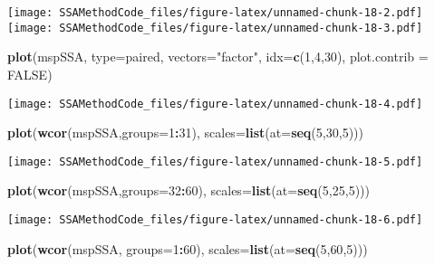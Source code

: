 \documentclass[
]{article}
\newenvironment{Shaded}{\begin{snugshade}}{\end{snugshade}}
\newcommand{\AttributeTok}[1]{\textcolor[rgb]{0.13,0.29,0.53}{#1}}
\newcommand{\ConstantTok}[1]{\textcolor[rgb]{0.56,0.35,0.01}{#1}}
\newcommand{\DecValTok}[1]{\textcolor[rgb]{0.00,0.00,0.81}{#1}}
\newcommand{\FunctionTok}[1]{\textcolor[rgb]{0.13,0.29,0.53}{\textbf{#1}}}
\newcommand{\NormalTok}[1]{#1}
\newcommand{\SpecialCharTok}[1]{\textcolor[rgb]{0.81,0.36,0.00}{\textbf{#1}}}
\newcommand{\StringTok}[1]{\textcolor[rgb]{0.31,0.60,0.02}{#1}}
\begin{document}
\texttt{[image: SSAMethodCode\_files/figure-latex/unnamed-chunk-18-2.pdf]}
\texttt{[image: SSAMethodCode\_files/figure-latex/unnamed-chunk-18-3.pdf]}

\begin{Shaded}
\begin{Highlighting}[]
\FunctionTok{plot}\NormalTok{(mspSSA, }\AttributeTok{type=}\StringTok{\textquotesingle{}paired\textquotesingle{}}\NormalTok{, }\AttributeTok{vectors=}\StringTok{"factor"}\NormalTok{, }\AttributeTok{idx=}\FunctionTok{c}\NormalTok{(}\DecValTok{1}\NormalTok{,}\DecValTok{4}\NormalTok{,}\DecValTok{30}\NormalTok{), }\AttributeTok{plot.contrib =} \ConstantTok{FALSE}\NormalTok{)}
\end{Highlighting}
\end{Shaded}

\texttt{[image: SSAMethodCode\_files/figure-latex/unnamed-chunk-18-4.pdf]}

\begin{Shaded}
\begin{Highlighting}[]
\FunctionTok{plot}\NormalTok{(}\FunctionTok{wcor}\NormalTok{(mspSSA,}\AttributeTok{groups=}\DecValTok{1}\SpecialCharTok{:}\DecValTok{31}\NormalTok{), }\AttributeTok{scales=}\FunctionTok{list}\NormalTok{(}\AttributeTok{at=}\FunctionTok{seq}\NormalTok{(}\DecValTok{5}\NormalTok{,}\DecValTok{30}\NormalTok{,}\DecValTok{5}\NormalTok{)))}
\end{Highlighting}
\end{Shaded}

\texttt{[image: SSAMethodCode\_files/figure-latex/unnamed-chunk-18-5.pdf]}

\begin{Shaded}
\begin{Highlighting}[]
\FunctionTok{plot}\NormalTok{(}\FunctionTok{wcor}\NormalTok{(mspSSA,}\AttributeTok{groups=}\DecValTok{32}\SpecialCharTok{:}\DecValTok{60}\NormalTok{), }\AttributeTok{scales=}\FunctionTok{list}\NormalTok{(}\AttributeTok{at=}\FunctionTok{seq}\NormalTok{(}\DecValTok{5}\NormalTok{,}\DecValTok{25}\NormalTok{,}\DecValTok{5}\NormalTok{)))}
\end{Highlighting}
\end{Shaded}

\texttt{[image: SSAMethodCode\_files/figure-latex/unnamed-chunk-18-6.pdf]}

\begin{Shaded}
\begin{Highlighting}[]
\FunctionTok{plot}\NormalTok{(}\FunctionTok{wcor}\NormalTok{(mspSSA, }\AttributeTok{groups=}\DecValTok{1}\SpecialCharTok{:}\DecValTok{60}\NormalTok{), }\AttributeTok{scales=}\FunctionTok{list}\NormalTok{(}\AttributeTok{at=}\FunctionTok{seq}\NormalTok{(}\DecValTok{5}\NormalTok{,}\DecValTok{60}\NormalTok{,}\DecValTok{5}\NormalTok{)))}
\end{Highlighting}
\end{Shaded}
\end{document}
